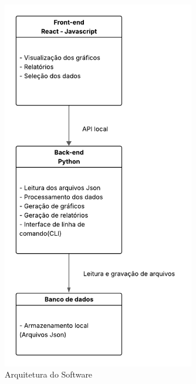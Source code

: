 

\begin{samepage}

\begin{figure}[!h]
	\centering
	\includegraphics[width=0.75\textwidth,height=0.5\textheight,keepaspectratio]{figuras/arquitetura.png}
	\caption{Arquitetura do Software}
	\label{fig_arquitetura}
\end{figure}


\end{samepage}
